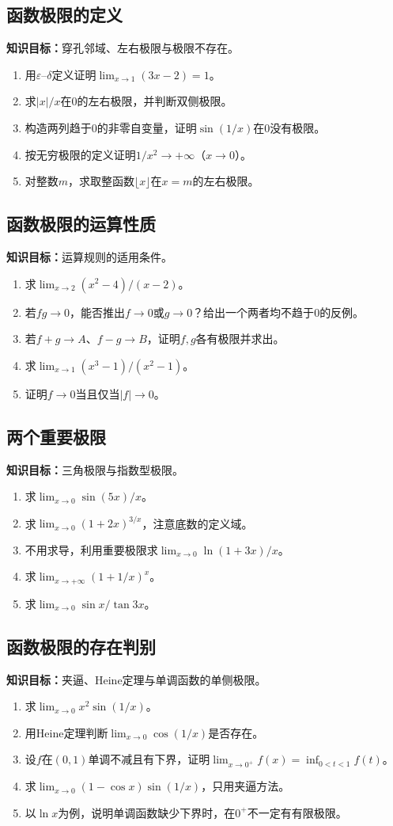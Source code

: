 \documentclass[11pt,a4paper,fontset=fandol]{ctexrep}
\newcommand{\goal}[1]{\textbf{知识目标：}#1\par}
\begin{document}
\subsection{函数极限的定义}
\goal{穿孔邻域、左右极限与极限不存在。}
\begin{enumerate}
\item 用$\varepsilon$--$\delta$定义证明$\lim_{x\to1}(3x-2)=1$。
\item 求$|x|/x$在$0$的左右极限，并判断双侧极限。
\item 构造两列趋于$0$的非零自变量，证明$\sin(1/x)$在$0$没有极限。
\item 按无穷极限的定义证明$1/x^2\to+\infty$（$x\to0$）。
\item 对整数$m$，求取整函数$\lfloor x\rfloor$在$x=m$的左右极限。
\end{enumerate}
\subsection{函数极限的运算性质}
\goal{运算规则的适用条件。}
\begin{enumerate}
\item 求$\lim_{x\to2}(x^2-4)/(x-2)$。
\item 若$fg\to0$，能否推出$f\to0$或$g\to0$？给出一个两者均不趋于$0$的反例。
\item 若$f+g\to A$、$f-g\to B$，证明$f,g$各有极限并求出。
\item 求$\lim_{x\to1}(x^3-1)/(x^2-1)$。
\item 证明$f\to0$当且仅当$|f|\to0$。
\end{enumerate}
\subsection{两个重要极限}
\goal{三角极限与指数型极限。}
\begin{enumerate}
\item 求$\lim_{x\to0}\sin(5x)/x$。
\item 求$\lim_{x\to0}(1+2x)^{3/x}$，注意底数的定义域。
\item 不用求导，利用重要极限求$\lim_{x\to0}\ln(1+3x)/x$。
\item 求$\lim_{x\to+\infty}(1+1/x)^x$。
\item 求$\lim_{x\to0}\sin x/\tan3x$。
\end{enumerate}
\subsection{函数极限的存在判别}
\goal{夹逼、Heine定理与单调函数的单侧极限。}
\begin{enumerate}
\item 求$\lim_{x\to0}x^2\sin(1/x)$。
\item 用Heine定理判断$\lim_{x\to0}\cos(1/x)$是否存在。
\item 设$f$在$(0,1)$单调不减且有下界，证明$\lim_{x\to0^+}f(x)=\inf_{0<t<1}f(t)$。
\item 求$\lim_{x\to0}(1-\cos x)\sin(1/x)$，只用夹逼方法。
\item 以$\ln x$为例，说明单调函数缺少下界时，在$0^+$不一定有有限极限。
\end{enumerate}
\end{document}
